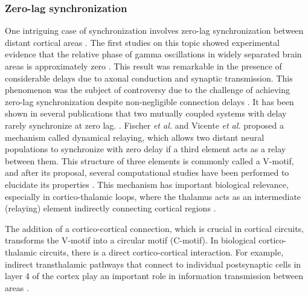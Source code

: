 \documentclass[../main.tex]{subfiles}
\begin{document}
\subsubsection{Zero-lag synchronization}
One intriguing case of synchronization involves zero-lag synchronization between distant cortical areas 
\citep{esfahani_zero-lag_2014,gollo_mechanisms_2014,vicente_dynamical_2008,chawla_zero-lag_2001,viriyopase_when_2012}.
The first studies on this topic showed experimental evidence that the relative phase of gamma oscillations in widely separated brain areas is approximately zero \citep{frien1994stimulus, roelfsema_visuomotor_1997,castelo1998synchronization, rodriguez1999perception,gross2004modulation}.
This result was remarkable in the presence of considerable delays due to axonal conduction and synaptic transmission.
This phenomenon was the subject of controversy due to the challenge of achieving zero-lag synchronization despite non-negligible connection delays \citep{vicente_dynamical_2008,viriyopase_when_2012}.
It has been shown in several publications that two mutually coupled systems with delay rarely synchronize at zero lag. \citep{ernst1995synchronization,ernst1998delay,goel2002synchrony,zeitler2009asymmetry}.
Fischer \textit{et al.} \citep{fischer_zero-lag_2006} and Vicente \textit{et al.} \citep{vicente_dynamical_2008} proposed a mechanism called dynamical relaying, which allows two distant neural populations to synchronize with zero delay if a third element acts as a relay between them.
This structure of three elements is commonly called a V-motif, and after its proposal, several computational studies have been performed to elucidate its properties \citep{fischer_zero-lag_2006,uhlhaas_neural_2009,esfahani_zero-lag_2014,mirasso_anticipated_2017}.
This mechanism has important biological relevance, especially in cortico-thalamic loops, where the thalamus acts as an intermediate (relaying) element indirectly connecting cortical regions \citep{sysoeva_thalamo-cortical_2016, save_hippocampal-parietal_2000,sherman_thalamocortical_2012,uhlhaas_neural_2006,theyel2010corticothalamocortical}.

The addition of a cortico-cortical connection, which is crucial in cortical circuits, transforms the V-motif into a circular motif (C-motif).
In biological cortico-thalamic circuits, there is a direct cortico-cortical interaction.
For example, indirect transthalamic pathways that connect to individual postsynaptic cells in layer 4 of the cortex play an important role in information transmission between areas \citep{sherman_thalamus_2016,theyel2010corticothalamocortical}.
\end{document}

